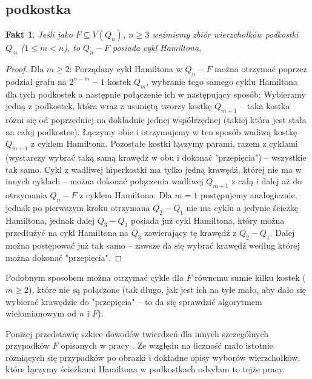 \documentclass{pracamgr}
\newtheorem{fact}[theorem]{Fakt}
\begin{document}
   \subsection{podkostka}
    \begin{fact}\label{hamilton dla F=Q_m}
     Jeśli jako $F\subseteq V(Q_n)$, $n\ge3$ weźmiemy zbiór wierzchołków podkostki $Q_m$ ($1\le m<n$), to $Q_n-F$ posiada cykl Hamiltona.
    \end{fact}
    \begin{proof}
     Dla $m\ge2$:\newline 
     Porządany cykl Hamiltona w $Q_n-F$ można otrzymać poprzez podział grafu na $2^{n-m}-1$ kostek $Q_m$, wybranie tego samego cyklu Hamiltona dla tych podkostek
     a następnie połączenie ich w następujący sposób:\newline
     Wybieramy jedną z podkostek, która wraz z usuniętą tworzy kostkę $Q_{m+1}$ -- taka kostka różni się od poprzedniej na dokładnie jednej współrzędnej
     (takiej która jest stała na całej podkostce). Łączymy obie i otrzymujemy w ten sposób wadiwą kostkę $Q_{m+1}$ z cyklem Hamiltona.
     Pozostałe kostki łączymy parami, razem z cyklami (wystarczy wybrać taką samą krawędź w obu i dokonać "przepięcia") -- wszystkie tak samo.
     Cykl z wadliwej hiperkostki ma tylko jedną krawędź, której nie ma w innych cyklach -- można dokonać połączenia wadliwej $Q_{m+1}$ z całą i dalej aż
     do otrzymania $Q_n-F$ z cyklem Hamiltona.\newline
     Dla $m=1$ postępujemy analogicznie, jednak po pierwszym kroku otrzymana $Q_2-Q_1$ nie ma cyklu a jedynie ścieżkę Hamiltona, jednak dalej $Q_3-Q_1$
     posiada już cykl Hamiltona, który można przedłużyć na cykl Hamiltona na $Q_3$ zawierający tę krawędź z $Q_2-Q_1$. Dalej można postępować już tak samo
     -- zawsze da się wybrać krawędź według której można dokonać "przepięcia".
    \end{proof}
    Podobnym sposobem można otrzymać cykle dla $F$ równemu sumie kilku kostek ($m\ge2$), które nie są połączone (tak długo, jak jest ich na tyle mało,
    aby dało się wybierać krawędzie do "przepięcia" -- to da się sprawdzić algorytmem wielomianowym od $n$ i $F$).\newline
   
   Poniżej przedstawię szkice dowodów twierdzeń dla innych szczególnych przypadków $F$ opisanych w pracy \cite{Pegr}.
   Ze względu na liczność mało istotnie różniących się przypadków po obrazki i dokładne opisy wyborów wierzchołków,
   które łączymy ścieżkami Hamiltona w podkostkach odsyłam to tejże pracy.
\end{document}
